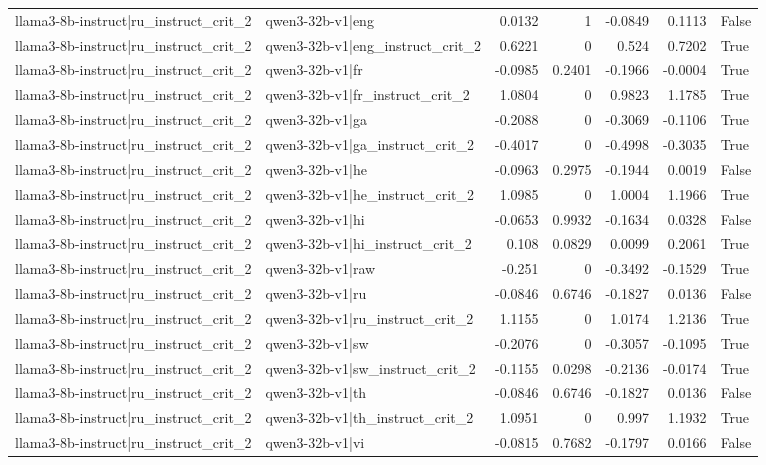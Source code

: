\begin{table}
\begin{tabular}{l l r r r r l}
llama3-8b-instruct|ru_instruct_crit_2 & qwen3-32b-v1|eng & 0.0132 & 1 & -0.0849 & 0.1113 & False \\
llama3-8b-instruct|ru_instruct_crit_2 & qwen3-32b-v1|eng_instruct_crit_2 & 0.6221 & 0 & 0.524 & 0.7202 & True \\
llama3-8b-instruct|ru_instruct_crit_2 & qwen3-32b-v1|fr & -0.0985 & 0.2401 & -0.1966 & -0.0004 & True \\
llama3-8b-instruct|ru_instruct_crit_2 & qwen3-32b-v1|fr_instruct_crit_2 & 1.0804 & 0 & 0.9823 & 1.1785 & True \\
llama3-8b-instruct|ru_instruct_crit_2 & qwen3-32b-v1|ga & -0.2088 & 0 & -0.3069 & -0.1106 & True \\
llama3-8b-instruct|ru_instruct_crit_2 & qwen3-32b-v1|ga_instruct_crit_2 & -0.4017 & 0 & -0.4998 & -0.3035 & True \\
llama3-8b-instruct|ru_instruct_crit_2 & qwen3-32b-v1|he & -0.0963 & 0.2975 & -0.1944 & 0.0019 & False \\
llama3-8b-instruct|ru_instruct_crit_2 & qwen3-32b-v1|he_instruct_crit_2 & 1.0985 & 0 & 1.0004 & 1.1966 & True \\
llama3-8b-instruct|ru_instruct_crit_2 & qwen3-32b-v1|hi & -0.0653 & 0.9932 & -0.1634 & 0.0328 & False \\
llama3-8b-instruct|ru_instruct_crit_2 & qwen3-32b-v1|hi_instruct_crit_2 & 0.108 & 0.0829 & 0.0099 & 0.2061 & True \\
llama3-8b-instruct|ru_instruct_crit_2 & qwen3-32b-v1|raw & -0.251 & 0 & -0.3492 & -0.1529 & True \\
llama3-8b-instruct|ru_instruct_crit_2 & qwen3-32b-v1|ru & -0.0846 & 0.6746 & -0.1827 & 0.0136 & False \\
llama3-8b-instruct|ru_instruct_crit_2 & qwen3-32b-v1|ru_instruct_crit_2 & 1.1155 & 0 & 1.0174 & 1.2136 & True \\
llama3-8b-instruct|ru_instruct_crit_2 & qwen3-32b-v1|sw & -0.2076 & 0 & -0.3057 & -0.1095 & True \\
llama3-8b-instruct|ru_instruct_crit_2 & qwen3-32b-v1|sw_instruct_crit_2 & -0.1155 & 0.0298 & -0.2136 & -0.0174 & True \\
llama3-8b-instruct|ru_instruct_crit_2 & qwen3-32b-v1|th & -0.0846 & 0.6746 & -0.1827 & 0.0136 & False \\
llama3-8b-instruct|ru_instruct_crit_2 & qwen3-32b-v1|th_instruct_crit_2 & 1.0951 & 0 & 0.997 & 1.1932 & True \\
llama3-8b-instruct|ru_instruct_crit_2 & qwen3-32b-v1|vi & -0.0815 & 0.7682 & -0.1797 & 0.0166 & False \\

\end{tabular}
\end{table}
